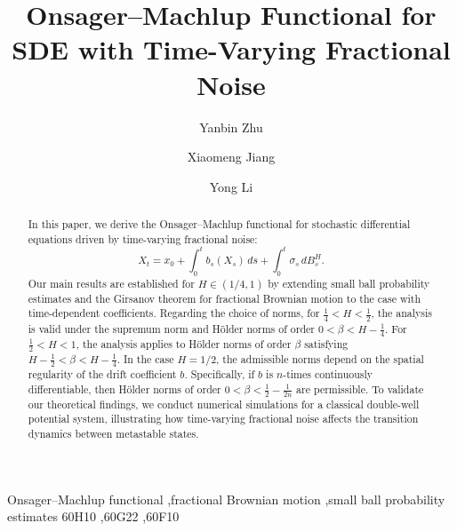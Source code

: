 \documentclass[preprint,12pt]{elsarticle}
\theoremstyle{definition}  %
\theoremstyle{plain}  %
\begin{document}
\begin{frontmatter}

\title{Onsager--Machlup Functional for SDE with Time-Varying Fractional Noise}

\author[inst1]{Yanbin Zhu}
 \author[inst1]{Xiaomeng Jiang}
 \author[inst1,inst2]{Yong Li}
 \address[inst1]{College of Mathematics, Jilin University, Changchun 130012, PR China}
 \address[inst2]{School of Mathematics and statistics and Center for Mathematics and Interdisciplinary Sciences, Northeast Normal University, Changchun 130024, PR China}


\begin{abstract}
In this paper, we derive the Onsager–Machlup functional for stochastic differential equations driven by time-varying fractional noise:
\begin{equation*}
      X_t = x_0 + \int_0^t b_s(X_s)\,ds + \int_0^t \sigma_s\,dB^H_s.
\end{equation*}
Our main results are established for $H \in (1/4,1)$ by extending small ball probability estimates and the Girsanov theorem for fractional Brownian motion to the case with time-dependent coefficients. Regarding the choice of norms, for $ \frac{1}{4} < H < \frac{1}{2} $, the analysis is valid under the supremum norm and Hölder norms of order $ 0 < \beta < H - \frac{1}{4} $. For $ \frac{1}{2} < H < 1 $, the analysis applies to Hölder norms of order $\beta$ satisfying $H - \frac{1}{2} < \beta < H - \frac{1}{4}$. In the case $H=1/2$, the admissible norms depend on the spatial regularity of the drift coefficient $b$. Specifically, if $b$ is $n$-times continuously differentiable, then Hölder norms of order $0<\beta<\frac{1}{2}-\frac{1}{2n}$ are permissible. To validate our theoretical findings, we conduct numerical simulations for a classical double-well potential system, illustrating how time-varying fractional noise affects the transition dynamics between metastable states.
\end{abstract}

\begin{keyword}
Onsager–Machlup functional \sep fractional Brownian motion \sep small ball probability estimates \MSC [2020] 60H10 \sep 60G22 \sep 60F10
\end{keyword}

\end{frontmatter}
\end{document}
